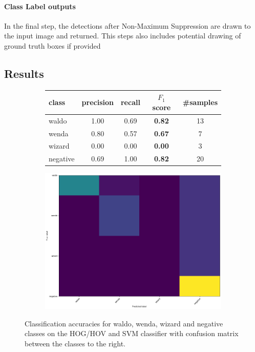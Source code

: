 \documentclass[11pt]{article}
\begin{document}
\paragraph{Class Label outputs}
In the final step, the detections after Non-Maximum Suppression are drawn to the input image and returned.
This steps also includes potential drawing of ground truth boxes if provided

\subsection{Results}\label{subsec:results}

\begin{figure}[]
    \centering
    \begin{subfigure}{0.6\linewidth}
    \begin{tabular}{lcccc}
        \toprule
        class & precision & recall & \( F_1 \) score & \#samples \\
        \midrule
           waldo &  1.00 &  0.69 & \textbf{0.82} &  13 \\
           wenda &  0.80 &  0.57 & \textbf{0.67} &   7 \\
          wizard &  0.00 &  0.00 & \textbf{0.00} &   3 \\
        negative &  0.69 &  1.00 & \textbf{0.82} &  20 \\
        \bottomrule
    \end{tabular}
    \end{subfigure}
    \begin{subfigure}{0.35\linewidth}
    \includegraphics[width =\linewidth]{figures/confusion_matrix}
    \end{subfigure}

    \caption{Classification accuracies for waldo, wenda, wizard and negative classes on the HOG/HOV and SVM classifier
    with confusion matrix between the classes to the right.}
    \label{tab:classification_acc}
\end{figure}
\end{document}
